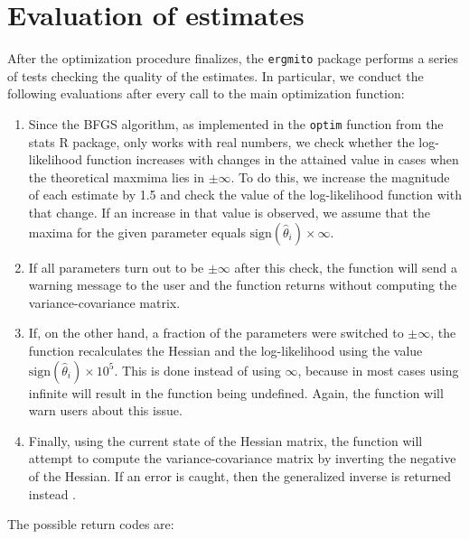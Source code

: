 \documentclass[review, nonatbib,doubleblind]{elsarticle/elsarticle}
\begin{document}
\section{\label{sec:evaluation-of-estimates}Evaluation of estimates}

After the optimization procedure finalizes, the \texttt{ergmito} package performs a series of tests checking the quality of the estimates. In particular, we conduct the following evaluations after every call to the main optimization function:

\begin{enumerate}
	\item Since the BFGS algorithm, as implemented in the \texttt{optim} function from the stats R package, only works with real numbers, we check whether the log-likelihood function increases with changes in the attained value in cases when the theoretical maxmima lies in $\pm\infty$. To do this, we increase the magnitude of each estimate by 1.5 and check the value of the log-likelihood function with that change. If an increase in that value is observed, we assume that the maxima for the given parameter equals $\mbox{sign}(\hat\theta_i)\times\infty$.
	
	\item If all parameters turn out to be $\pm\infty$ after this check, the function will send a warning message to the user and the function returns without computing the variance-covariance matrix.
	
	\item If, on the other hand, a fraction of the parameters were switched to $\pm\infty$, the function recalculates the Hessian and the log-likelihood using the value $\mbox{sign}(\hat \theta_i)\times 10^{5}$. This is done instead of using $\infty$, because in most cases using infinite will result in the function being undefined. Again, the function will warn users about this issue.
	
	\item Finally, using the current state of the Hessian matrix, the function will attempt to compute the variance-covariance matrix by inverting the negative of the Hessian. If an error is caught, then the generalized inverse is returned instead \cite{Gill2004}.
\end{enumerate}

The possible return codes are:
\end{document}
